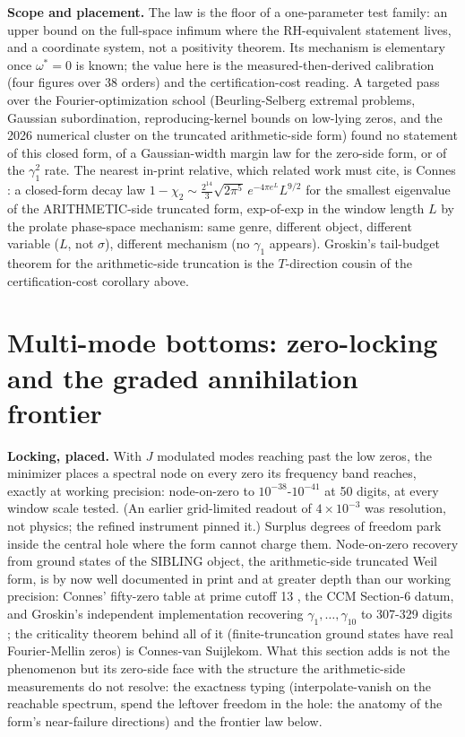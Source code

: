 \documentclass[10pt]{article}
\begin{document}
\textbf{Scope and placement.} The law is the floor of a one-parameter test family: an upper bound on the full-space infimum where the RH-equivalent statement lives, and a coordinate system, not a positivity theorem. Its mechanism is elementary once $\omega^* = 0$ is known; the value here is the measured-then-derived calibration (four figures over 38 orders) and the certification-cost reading. A targeted pass over the Fourier-optimization school (Beurling-Selberg extremal problems, Gaussian subordination, reproducing-kernel bounds on low-lying zeros, and the 2026 numerical cluster on the truncated arithmetic-side form) found no statement of this closed form, of a Gaussian-width margin law for the zero-side form, or of the $\gamma_1^2$ rate. The nearest in-print relative, which related work must cite, is Connes \cite[Section 6.4]{C26}: a closed-form decay law $1 - \chi_2 \sim \frac{2^{14}}{3}\sqrt{2\pi^5}\, e^{-4\pi e^L} L^{9/2}$ for the smallest eigenvalue of the ARITHMETIC-side truncated form, exp-of-exp in the window length $L$ by the prolate phase-space mechanism: same genre, different object, different variable ($L$, not $\sigma$), different mechanism (no $\gamma_1$ appears). Groskin's tail-budget theorem for the arithmetic-side truncation \cite[Thm 3.2]{G26b} is the $T$-direction cousin of the certification-cost corollary above.

\section{Multi-mode bottoms: zero-locking and the graded annihilation frontier}\label{sec:multi}

\textbf{Locking, placed.} With $J$ modulated modes reaching past the low zeros, the minimizer places a spectral node on every zero its frequency band reaches, exactly at working precision: node-on-zero to $10^{-38}$-$10^{-41}$ at 50 digits, at every window scale tested. (An earlier grid-limited readout of $4 \times 10^{-3}$ was resolution, not physics; the refined instrument pinned it.) Surplus degrees of freedom park inside the central hole where the form cannot charge them. Node-on-zero recovery from ground states of the SIBLING object, the arithmetic-side truncated Weil form, is by now well documented in print and at greater depth than our working precision: Connes' fifty-zero table at prime cutoff 13 \cite[Section 5]{C26}, the CCM Section-6 datum, and Groskin's independent implementation recovering $\gamma_1, \ldots, \gamma_{10}$ to 307-329 digits \cite{G26a}; the criticality theorem behind all of it (finite-truncation ground states have real Fourier-Mellin zeros) is Connes-van Suijlekom. What this section adds is not the phenomenon but its zero-side face with the structure the arithmetic-side measurements do not resolve: the exactness typing (interpolate-vanish on the reachable spectrum, spend the leftover freedom in the hole: the anatomy of the form's near-failure directions) and the frontier law below.
\end{document}
